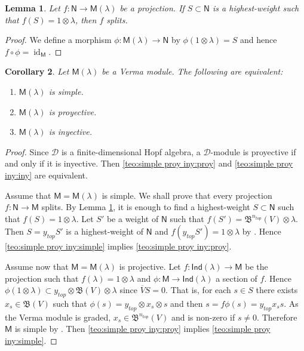 \documentclass[reqno]{amsart}
\newcommand{\ytop}{y_{top}}
\newcommand{\oV}{\overline{V}}
\renewcommand{\_}[1]{_{\left( #1 \right)}}
\renewcommand{\^}[1]{^{\left( #1 \right)}}
\newcommand{\ot}{{\otimes}}
\newcommand\fInd{\mathsf{Ind}}
\newcommand\fM{\mathsf{M}}
\newcommand\fN{\mathsf{N}}
\newcommand{\D}{\mathcal{D}}
\newcommand{\BV}{{\mathfrak B}}
\newcommand\id{\operatorname{id}}
\theoremstyle{plain}
\newtheorem{lema}{Lemma}[section]
\newtheorem{cor}[lema]{Corollary}
\theoremstyle{definition}
\theoremstyle{remark}
\begin{document}
\begin{lema}\label{le:projection over verma split}
Let $f:\fN\rightarrow\fM(\lambda)$ be a projection. If $S\subset\fN$ is a highest-weight such that $f(S)=1\ot\lambda$, then $f$ splits.
\end{lema}

\begin{proof}
We define a morphism $\phi:\fM(\lambda)\rightarrow\fN$ by $\phi(1\ot\lambda)=S$ and hence $f\circ \phi=\id_{\fM}$. 
\end{proof}


\begin{cor}\label{teo:simple proy iny}
Let $\fM(\lambda)$ be a Verma module. The following are equivalent:
\begin{enumerate}[label=(\roman*)]
\item\label{teo:simple proy iny:simple} $\fM(\lambda)$ is simple.
\item\label{teo:simple proy iny:proy} $\fM(\lambda)$ is proyective.
\item\label{teo:simple proy iny:iny} $\fM(\lambda)$ is inyective.
\end{enumerate} 
\end{cor}


\begin{proof}
Since $\D$ is a finite-dimensional Hopf algebra, a $\D$-module is proyective if and only if it is inyective. Then \ref{teo:simple proy iny:proy} and \ref{teo:simple proy iny:iny} are equivalent.

Assume that $\fM=\fM(\lambda)$ is simple. We shall prove that every projection $f:\fN\rightarrow\fM$ splits. By Lemma \ref{le:projection over verma split}, it is enough to find a highest-weight $S\subset\fN$ such that $f(S)=1\ot\lambda$. Let $S'$ be a weight of $\fN$ such that $f(S')=\BV^{n_{top}}(V)\ot\lambda$. Then $S=\ytop S'$ is a highest-weight of $\fN$ and $f(\ytop S')=1\ot\lambda$ by \cite[Corollary 15]{PV2}. Hence \ref{teo:simple proy iny:simple} implies \ref{teo:simple proy iny:proy}.

Assume now that $\fM=\fM(\lambda)$ is projective. Let $f:\fInd(\lambda)\rightarrow\fM$ be the projection such that $f(\lambda)=1\ot\lambda$ and $\phi:\fM\rightarrow\fInd(\lambda)$ a section of $f$. Hence $\phi(1\ot\lambda)\subset\ytop\ot\BV(V)\ot\lambda$ since $\oV S=0$. That is, for each $s\in S$ there exists $x_s\in\BV(V)$ such that $\phi(s)=\ytop\ot x_s\ot s$ and then $s=f\phi(s)=\ytop x_ss$. As the Verma module is graded, $x_s\in\BV^{n_{top}}(V)$ and is non-zero if $s\neq0$. Therefore $\fM$ is simple by \cite[Corollary 15]{PV2}. Then \ref{teo:simple proy iny:proy} implies \ref{teo:simple proy iny:simple}.
\end{proof}
\end{document}
